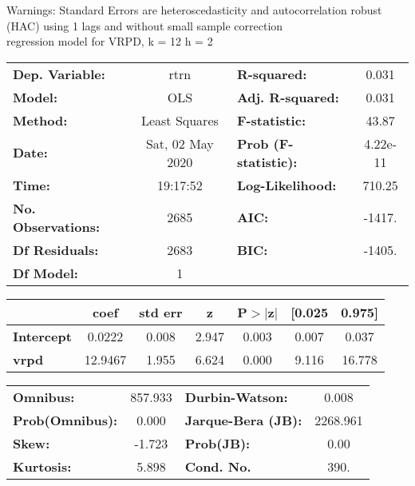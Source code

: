 Warnings: \newline
 [1] Standard Errors are heteroscedasticity and autocorrelation robust (HAC) using 1 lags and without small sample correction\\ 

regression model for VRPD, k = 12 h = 2\begin{center}
\begin{tabular}{lclc}
\toprule
\textbf{Dep. Variable:}    &       rtrn       & \textbf{  R-squared:         } &     0.031   \\
\textbf{Model:}            &       OLS        & \textbf{  Adj. R-squared:    } &     0.031   \\
\textbf{Method:}           &  Least Squares   & \textbf{  F-statistic:       } &     43.87   \\
\textbf{Date:}             & Sat, 02 May 2020 & \textbf{  Prob (F-statistic):} &  4.22e-11   \\
\textbf{Time:}             &     19:17:52     & \textbf{  Log-Likelihood:    } &    710.25   \\
\textbf{No. Observations:} &        2685      & \textbf{  AIC:               } &    -1417.   \\
\textbf{Df Residuals:}     &        2683      & \textbf{  BIC:               } &    -1405.   \\
\textbf{Df Model:}         &           1      & \textbf{                     } &             \\
\bottomrule
\end{tabular}
\begin{tabular}{lcccccc}
                   & \textbf{coef} & \textbf{std err} & \textbf{z} & \textbf{P$> |$z$|$} & \textbf{[0.025} & \textbf{0.975]}  \\
\midrule
\textbf{Intercept} &       0.0222  &        0.008     &     2.947  &         0.003        &        0.007    &        0.037     \\
\textbf{vrpd}      &      12.9467  &        1.955     &     6.624  &         0.000        &        9.116    &       16.778     \\
\bottomrule
\end{tabular}
\begin{tabular}{lclc}
\textbf{Omnibus:}       & 857.933 & \textbf{  Durbin-Watson:     } &    0.008  \\
\textbf{Prob(Omnibus):} &   0.000 & \textbf{  Jarque-Bera (JB):  } & 2268.961  \\
\textbf{Skew:}          &  -1.723 & \textbf{  Prob(JB):          } &     0.00  \\
\textbf{Kurtosis:}      &   5.898 & \textbf{  Cond. No.          } &     390.  \\
\bottomrule
\end{tabular}
\end{center}

